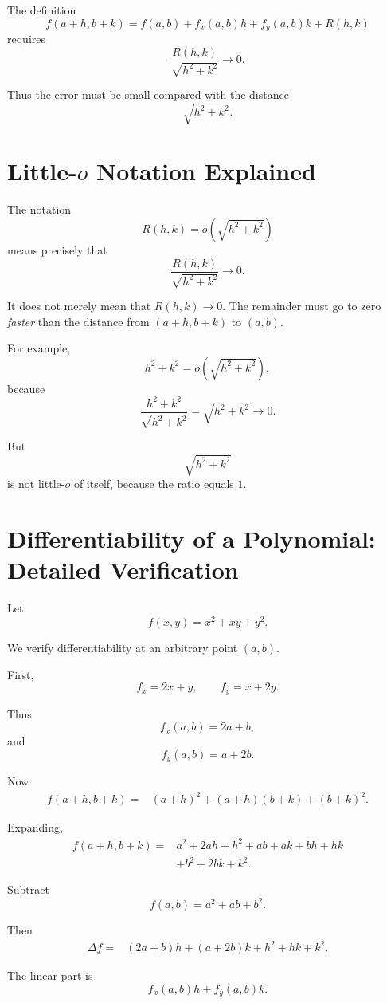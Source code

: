 \documentclass[11pt,oneside]{book}
\theoremstyle{studentthm}
\theoremstyle{definition}
\begin{document}
The definition
\[
f(a+h,b+k)
=
f(a,b)
+
f_x(a,b)h
+
f_y(a,b)k
+
R(h,k)
\]
requires
\[
\frac{R(h,k)}{\sqrt{h^2+k^2}}
\to0.
\]

Thus the error must be small compared with the distance
\[
\sqrt{h^2+k^2}.
\]

\section{Little-\(o\) Notation Explained}

The notation
\[
R(h,k)=o\!\left(\sqrt{h^2+k^2}\right)
\]
means precisely that
\[
\frac{R(h,k)}
{\sqrt{h^2+k^2}}
\to0.
\]

It does not merely mean that \(R(h,k)\to0\). The remainder must go to
zero \emph{faster} than the distance from \((a+h,b+k)\) to \((a,b)\).

For example,
\[
h^2+k^2
=
o\!\left(\sqrt{h^2+k^2}\right),
\]
because
\[
\frac{h^2+k^2}{\sqrt{h^2+k^2}}
=
\sqrt{h^2+k^2}
\to0.
\]

But
\[
\sqrt{h^2+k^2}
\]
is not little-\(o\) of itself, because the ratio equals \(1\).

\section{Differentiability of a Polynomial: Detailed Verification}

Let
\[
f(x,y)=x^2+xy+y^2.
\]

We verify differentiability at an arbitrary point \((a,b)\).

First,
\[
f_x=2x+y,
\qquad
f_y=x+2y.
\]

Thus
\[
f_x(a,b)=2a+b,
\]
and
\[
f_y(a,b)=a+2b.
\]

Now
\[
\begin{aligned}
f(a+h,b+k)
={}&
(a+h)^2
+
(a+h)(b+k)
+
(b+k)^2.
\end{aligned}
\]

Expanding,
\[
\begin{aligned}
f(a+h,b+k)
={}&
a^2+2ah+h^2
+
ab+ak+bh+hk\\
&+
b^2+2bk+k^2.
\end{aligned}
\]

Subtract
\[
f(a,b)=a^2+ab+b^2.
\]

Then
\[
\begin{aligned}
\Delta f
={}&
(2a+b)h
+
(a+2b)k
+
h^2+hk+k^2.
\end{aligned}
\]

The linear part is
\[
f_x(a,b)h+f_y(a,b)k.
\]
\end{document}
